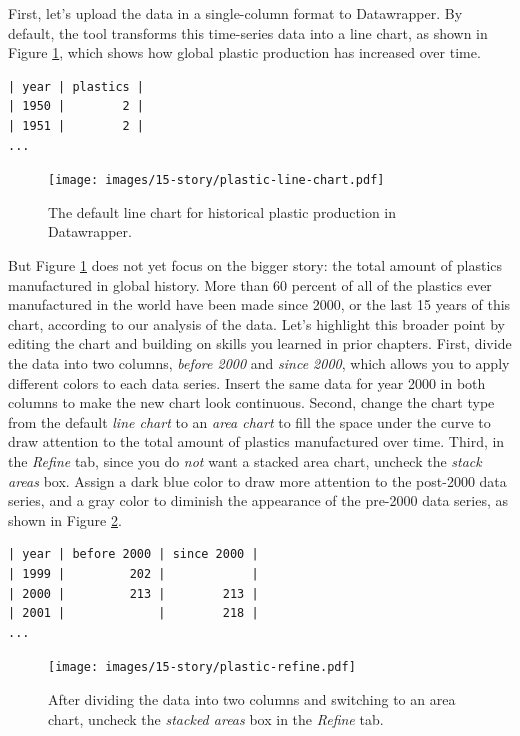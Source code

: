\documentclass[
  english,
]{book}
\begin{document}
First, let's upload the data in a single-column format to Datawrapper. By default, the tool transforms this time-series data into a line chart, as shown in Figure \ref{fig:plastic-line-chart}, which shows how global plastic production has increased over time.

\begin{verbatim}
| year | plastics |
| 1950 |        2 |
| 1951 |        2 |
...
\end{verbatim}



\begin{figure}
\centering
\texttt{[image: images/15-story/plastic-line-chart.pdf]}
\caption{\label{fig:plastic-line-chart}The default line chart for historical plastic production in Datawrapper.}
\end{figure}

But Figure \ref{fig:plastic-line-chart} does not yet focus on the bigger story: the total amount of plastics manufactured in global history. More than 60 percent of all of the plastics ever manufactured in the world have been made since 2000, or the last 15 years of this chart, according to our analysis of the data. Let's highlight this broader point by editing the chart and building on skills you learned in prior chapters. First, divide the data into two columns, \emph{before 2000} and \emph{since 2000}, which allows you to apply different colors to each data series. Insert the same data for year 2000 in both columns to make the new chart look continuous. Second, change the chart type from the default \emph{line chart} to an \emph{area chart} to fill the space under the curve to draw attention to the total amount of plastics manufactured over time. Third, in the \emph{Refine} tab, since you do \emph{not} want a stacked area chart, uncheck the \emph{stack areas} box. Assign a dark blue color to draw more attention to the post-2000 data series, and a gray color to diminish the appearance of the pre-2000 data series, as shown in Figure \ref{fig:plastic-refine}.

\begin{verbatim}
| year | before 2000 | since 2000 |
| 1999 |         202 |            |
| 2000 |         213 |        213 |
| 2001 |             |        218 |
...
\end{verbatim}



\begin{figure}
\centering
\texttt{[image: images/15-story/plastic-refine.pdf]}
\caption{\label{fig:plastic-refine}After dividing the data into two columns and switching to an area chart, uncheck the \emph{stacked areas} box in the \emph{Refine} tab.}
\end{figure}
\end{document}

